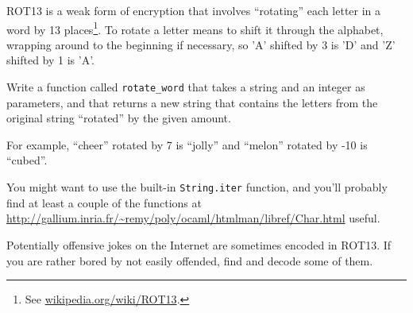 \documentclass[10pt]{book}
\begin{document}
\begin{ex}

\label{exrotate}
ROT13 is a weak form of encryption that involves ``rotating'' each
letter in a word by 13 places\footnote{See
  \url{wikipedia.org/wiki/ROT13}.}.  To rotate a letter means
to shift it through the alphabet, wrapping around to the beginning if
necessary, so 'A' shifted by 3 is 'D' and 'Z' shifted by 1 is 'A'.

Write a function called \verb"rotate_word"
that takes a string and an integer as parameters, and that returns
a new string that contains the letters from the original string
``rotated'' by the given amount.  

For example, ``cheer'' rotated by 7 is ``jolly'' and ``melon'' rotated
by -10 is ``cubed''.  


You might want to use the built-in {\tt String.iter} function, and
you'll probably find at least a couple of the functions at
\url{http://gallium.inria.fr/~remy/poly/ocaml/htmlman/libref/Char.html}
useful.

Potentially offensive jokes on the Internet are sometimes encoded
in ROT13.  If you are rather bored by not easily offended, find and 
decode some of them.
\end{ex}
\end{document}
